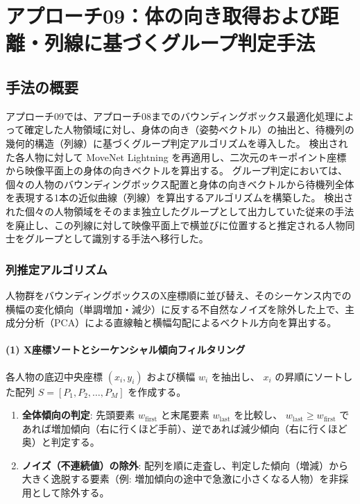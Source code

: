 \section{アプローチ09：体の向き取得および距離・列線に基づくグループ判定手法}

\subsection{手法の概要}
アプローチ09では、アプローチ08までのバウンディングボックス最適化処理によって確定した人物領域に対し、身体の向き（姿勢ベクトル）の抽出と、待機列の幾何的構造（列線）に基づくグループ判定アルゴリズムを導入した。
検出された各人物に対して MoveNet Lightning を再適用し、二次元のキーポイント座標から映像平面上の身体の向きベクトルを算出する。
グループ判定においては、個々の人物のバウンディングボックス配置と身体の向きベクトルから待機列全体を表現する1本の近似曲線（列線）を算出するアルゴリズムを構築した。
検出された個々の人物領域をそのまま独立したグループとして出力していた従来の手法を廃止し、この列線に対して映像平面上で横並びに位置すると推定される人物同士をグループとして識別する手法へ移行した。

\subsubsection{列推定アルゴリズム}
人物群をバウンディングボックスのX座標順に並び替え、そのシーケンス内での横幅の変化傾向（単調増加・減少）に反する不自然なノイズを除外した上で、主成分分析（PCA）による直線軸と横幅勾配によるベクトル方向を算出する。

\paragraph{(1) X座標ソートとシーケンシャル傾向フィルタリング}
各人物の底辺中央座標 $(x_i, y_i)$ および横幅 $w_i$ を抽出し、 $x_i$ の昇順にソートした配列 $S = [P_1, P_2, \dots, P_M]$ を作成する。

\begin{enumerate}
    \item \textbf{全体傾向の判定}: 
    先頭要素 $w_{\text{first}}$ と末尾要素 $w_{\text{last}}$ を比較し、 $w_{\text{last}} \ge w_{\text{first}}$ であれば増加傾向（右に行くほど手前）、逆であれば減少傾向（右に行くほど奥）と判定する。

    \item \textbf{ノイズ（不連続値）の除外}: 
    配列を順に走査し、判定した傾向（増減）から大きく逸脱する要素（例: 増加傾向の途中で急激に小さくなる人物）を非採用として除外する。
\end{enumerate}

